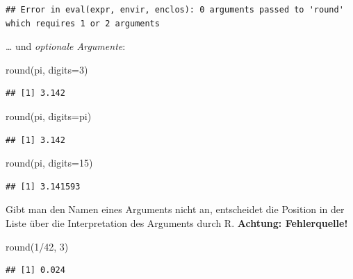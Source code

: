 \documentclass[
]{book}
\newenvironment{Shaded}{\begin{snugshade}}{\end{snugshade}}
\newcommand{\AttributeTok}[1]{\textcolor[rgb]{0.77,0.63,0.00}{#1}}
\newcommand{\DecValTok}[1]{\textcolor[rgb]{0.00,0.00,0.81}{#1}}
\newcommand{\FunctionTok}[1]{\textcolor[rgb]{0.00,0.00,0.00}{#1}}
\newcommand{\NormalTok}[1]{#1}
\newcommand{\SpecialCharTok}[1]{\textcolor[rgb]{0.00,0.00,0.00}{#1}}
\begin{document}
\begin{verbatim}
## Error in eval(expr, envir, enclos): 0 arguments passed to 'round' which requires 1 or 2 arguments
\end{verbatim}

\ldots{} und \emph{optionale Argumente}:
\scriptsize

\begin{Shaded}
\begin{Highlighting}[]
\FunctionTok{round}\NormalTok{(pi, }\AttributeTok{digits=}\DecValTok{3}\NormalTok{)}
\end{Highlighting}
\end{Shaded}

\begin{verbatim}
## [1] 3.142
\end{verbatim}

\begin{Shaded}
\begin{Highlighting}[]
\FunctionTok{round}\NormalTok{(pi, }\AttributeTok{digits=}\NormalTok{pi)}
\end{Highlighting}
\end{Shaded}

\begin{verbatim}
## [1] 3.142
\end{verbatim}

\begin{Shaded}
\begin{Highlighting}[]
\FunctionTok{round}\NormalTok{(pi, }\AttributeTok{digits=}\DecValTok{15}\NormalTok{)}
\end{Highlighting}
\end{Shaded}

\begin{verbatim}
## [1] 3.141593
\end{verbatim}

Gibt man den Namen eines Arguments nicht an, entscheidet die Position in der Liste über die Interpretation des Arguments durch R. \textbf{Achtung: Fehlerquelle!}
\scriptsize

\begin{Shaded}
\begin{Highlighting}[]
\FunctionTok{round}\NormalTok{(}\DecValTok{1}\SpecialCharTok{/}\DecValTok{42}\NormalTok{, }\DecValTok{3}\NormalTok{)}
\end{Highlighting}
\end{Shaded}

\begin{verbatim}
## [1] 0.024
\end{verbatim}
\end{document}
